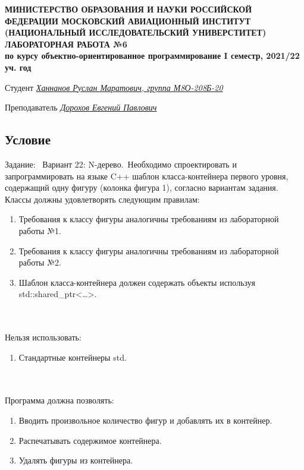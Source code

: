\documentclass[12pt]{article}
\begin{document}
\begin{titlepage}
\begin{center}
\textbf{МИНИСТЕРСТВО ОБРАЗОВАНИЯ И НАУКИ РОССИЙСКОЙ ФЕДЕРАЦИИ
\medskip
МОСКОВСКИЙ АВИАЦИОННЫЙ ИНСТИТУТ
(НАЦИОНАЛЬНЫЙ ИССЛЕДОВАТЕЛЬСКИЙ УНИВЕРСТИТЕТ)
\vfill\vfill
{\Huge ЛАБОРАТОРНАЯ РАБОТА №6} \\
по курсу объектно-ориентированное программирование
I семестр, 2021/22 уч. год}
\end{center}
\vfill

Студент \uline{\it {Ханнанов Руслан Маратович, группа М8О-208Б-20}\hfill}

Преподаватель \uline{\it {Дорохов Евгений Павлович}\hfill}

\vfill
\end{titlepage}

\subsection*{Условие}

Задание: \
Вариант 22: N-дерево.\
Необходимо спроектировать и запрограммировать на языке C++ шаблон класса-контейнера первого уровня, содержащий одну фигуру (колонка фигура 1), согласно вариантам задания. Классы должны удовлетворять следующим правилам:
\begin{enumerate}
\item Требования к классу фигуры аналогичны требованиям из лабораторной работы №1.
\item Требования к классу фигуры аналогичны требованиям из лабораторной работы №2.
\item Шаблон класса-контейнера должен содержать объекты используя std::shared\_ptr<…>.
\end{enumerate}
\\ \\
Нельзя использовать:
\begin{enumerate}
\item Стандартные контейнеры std.
\end{enumerate}
\\ \\
Программа должна позволять:
\begin{enumerate}
\item Вводить произвольное количество фигур и добавлять их в контейнер.
\item Распечатывать содержимое контейнера.
\item Удалять фигуры из контейнера.
\end{enumerate}
\end{document}
